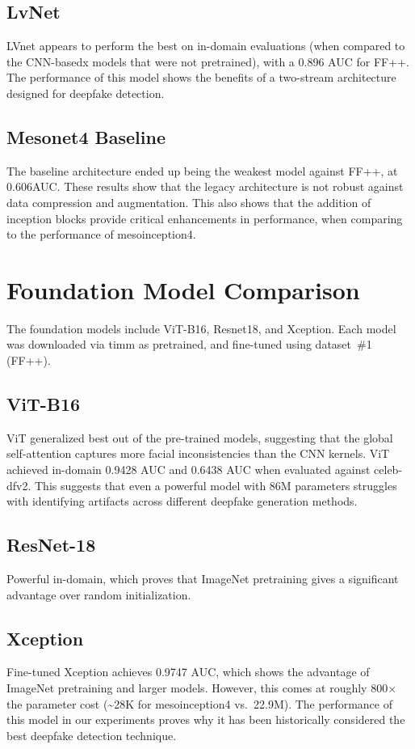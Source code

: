 \documentclass[conference]{IEEEtran}
\begin{document}
\subsection{LvNet}
LVnet appears to perform the best on in-domain evaluations (when compared to the CNN-basedx models that were not pretrained), with a 0.896 AUC for FF++. The performance of this model shows the benefits of a two-stream architecture designed for deepfake detection.

\subsection{Mesonet4 Baseline}
The baseline architecture ended up being the weakest model against FF++, at 0.606AUC. These results show that the legacy architecture is not robust against data compression and augmentation. This also shows that the addition of inception blocks provide critical enhancements in performance, when comparing to the performance of mesoinception4.

\section{Foundation Model Comparison}
\label{sec:foundation}

The foundation models include ViT-B16, Resnet18, and Xception. Each model was downloaded via timm as pretrained, and fine-tuned using dataset~\#1 (FF++).

\subsection{ViT-B16}
ViT generalized best out of the pre-trained models, suggesting that the global self-attention captures more facial inconsistencies than the CNN kernels. ViT achieved in-domain 0.9428 AUC and 0.6438 AUC when evaluated against celeb-dfv2. This suggests that even a powerful model with 86M parameters struggles with identifying artifacts across different deepfake generation methods.

\subsection{ResNet-18}
Powerful in-domain, which proves that ImageNet pretraining gives a significant advantage over random initialization.

\subsection{Xception}
Fine-tuned Xception achieves 0.9747 AUC, which shows the advantage of
ImageNet pretraining and larger models. However, this comes at roughly
800$\times$ the parameter cost (\textasciitilde{}28K for mesoinception4 vs.\ 22.9M). The performance of this model in our experiments proves why it has been historically considered the best deepfake detection technique.
 
\end{document}
